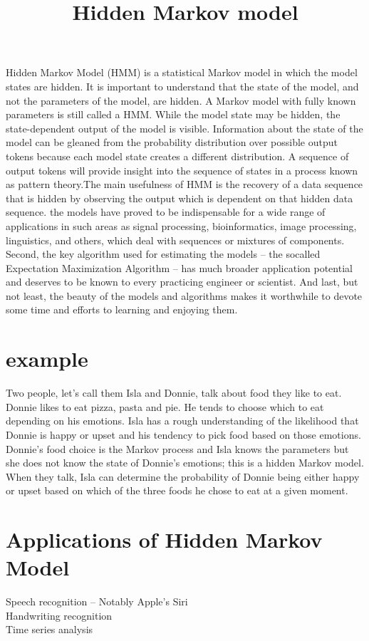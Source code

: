 \documentclass[10pts]{article}
\begin{document}
\title{Hidden Markov model}


\maketitle



Hidden Markov Model (HMM) is a statistical Markov model in which the model states are hidden. It is important to understand that the state of the model, and not the parameters of the model, are hidden. A Markov model with fully known parameters is still called a HMM. While the model state may be hidden, the state-dependent output of the model is visible. Information about the state of the model can be gleaned from the probability distribution over possible output tokens because each model state creates a different distribution. A sequence of output tokens will provide insight into the sequence of states in a process known as pattern theory.The main usefulness of HMM is the recovery of a data sequence that is hidden by observing the output which is dependent on that hidden data sequence.
the models have proved to be indispensable for a wide range of applications in such areas as signal processing, bioinformatics, image processing, linguistics, and others, which deal with sequences or mixtures of components. Second, the key algorithm used for estimating the models – the socalled Expectation Maximization Algorithm -- has much broader application potential and deserves to be known to every practicing engineer or scientist. And last, but not least, the beauty of the models and algorithms makes it worthwhile to devote some time and efforts to learning and enjoying them. 

\section{example}


Two people, let’s call them Isla and Donnie, talk about food they like to eat. Donnie likes to eat pizza, pasta and pie. He tends to choose which to eat depending on his emotions. Isla has a rough understanding of the likelihood that Donnie is happy or upset and his tendency to pick food based on those emotions. Donnie’s food choice is the Markov process and Isla knows the parameters but she does not know the state of Donnie’s emotions; this is a hidden Markov model. When they talk, Isla can determine the probability of Donnie being either happy or upset based on which of the three foods he chose to eat at a given moment.

\section{Applications of Hidden Markov Model}


Speech recognition – Notably Apple’s Siri\\
Handwriting recognition\\
Time series analysis\\
\end{document}
